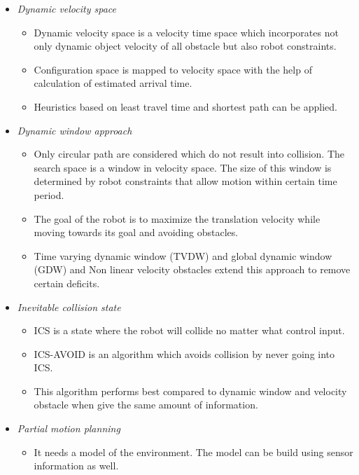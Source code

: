 \documentclass[12pt]{article}
\begin{document}
\begin{itemize}
\begin{itemize}
\begin{itemize}
            \item \textit{Dynamic velocity space}
            \begin{itemize}
                \item Dynamic velocity space is a velocity time space which incorporates not only dynamic object velocity of all obstacle but also robot constraints.
                \item Configuration space is mapped to velocity space with the help of calculation of estimated arrival time.
                \item Heuristics based on least travel time and shortest path can be applied.
            \end{itemize}
            \item \textit{Dynamic window approach}
            \begin{itemize}
                \item Only circular path are considered which do not result into collision. The search space is a window in velocity space. The size of this window is determined by robot constraints that allow motion within certain time period.
                \item The goal of the robot is to maximize the translation velocity while moving towards its goal and avoiding obstacles.
                \item Time varying dynamic window (TVDW) and global dynamic window (GDW) and Non linear velocity obstacles extend this approach to remove certain deficits.
            \end{itemize}
            \item \textit{Inevitable collision state}
            \begin{itemize}
                \item ICS is a state where the robot will collide no matter what control input.
                \item ICS-AVOID is an algorithm which avoids collision by never going into ICS\@.
                \item This algorithm performs best compared to dynamic window and velocity obstacle when give the same amount of information.
            \end{itemize}
            \item \textit{Partial motion planning}
            \begin{itemize}
                \item It needs a model of the environment. The model can be build using sensor information as well. 

\end{itemize}
\end{itemize}
\end{itemize}
\end{itemize}
\end{document}
